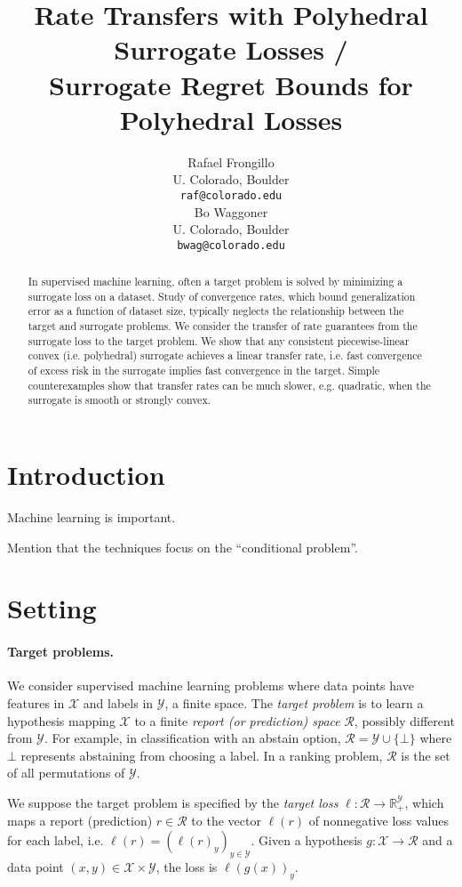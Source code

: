 \documentclass{article}
\title{Rate Transfers with Polyhedral Surrogate Losses /\\
  Surrogate Regret Bounds for Polyhedral Losses}
\author{%
  Rafael Frongillo \\
  U. Colorado, Boulder \\
  \texttt{raf@colorado.edu} \\
  \And
  Bo Waggoner \\
  U. Colorado, Boulder \\
  \texttt{bwag@colorado.edu}
}
\newcommand{\reals}{\mathbb{R}}
\newcommand{\R}{\mathcal{R}}
\newcommand{\X}{\mathcal{X}}
\newcommand{\Y}{\mathcal{Y}}
\begin{document}
\maketitle

\begin{abstract}
  In supervised machine learning, often a target problem is solved by minimizing a surrogate loss on a dataset.
  Study of convergence rates, which bound generalization error as a function of dataset size, typically neglects the relationship between the target and surrogate problems.
  We consider the transfer of rate guarantees from the surrogate loss to the target problem.
  We show that any consistent piecewise-linear convex (i.e. polyhedral) surrogate achieves a linear transfer rate, i.e. fast convergence of excess risk in the surrogate implies fast convergence in the target.
  Simple counterexamples show that transfer rates can be much slower, e.g. quadratic, when the surrogate is smooth or strongly convex.
\end{abstract}



\section{Introduction}

Machine learning is important.

Mention that the techniques focus on the ``conditional problem''.


\section{Setting}

\paragraph{Target problems.}
We consider supervised machine learning problems where data points have features in $\X$ and labels in $\Y$, a finite space.
The \emph{target problem} is to learn a hypothesis mapping $\X$ to a finite \emph{report (or prediction) space} $\R$, possibly different from $\Y$.
For example, in classification with an abstain option, $\R = \Y \cup \{\bot\}$ where $\bot$ represents abstaining from choosing a label.
In a ranking problem, $\R$ is the set of all permutations of $\Y$.

We suppose the target problem is specified by the \emph{target loss} $\ell:\R\to\reals^\Y_+$, which maps a report (prediction) $r \in \R$ to the vector $\ell(r)$ of nonnegative loss values for each label, i.e. $\ell(r) = (\ell(r)_y)_{y\in\Y}$.
Given a hypothesis $g: \X \to \R$ and a data point $(x,y) \in \X \times \Y$, the loss is $\ell(g(x))_y$.
\end{document}
